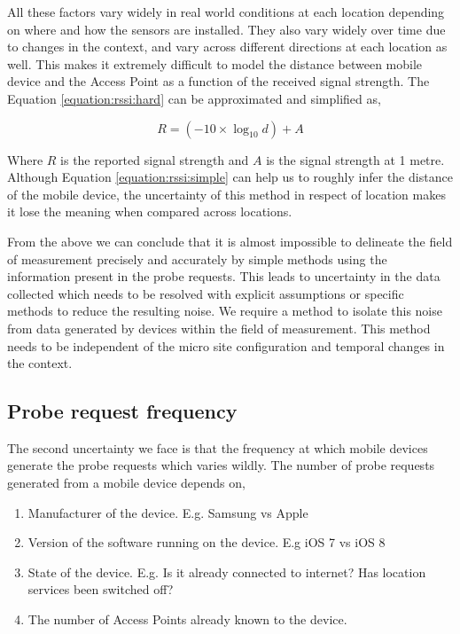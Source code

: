 All these factors vary widely in real world conditions at each location depending on where and how the sensors are installed.
They also vary widely over time due to changes in the context, and vary across different directions at each location as well.
This makes it extremely difficult to model the distance between mobile device and the Access Point as a function of the received signal strength.
The Equation \ref{equation:rssi:hard} can be approximated and simplified as,

\begin{equation}
  R = (-10 \times \log_{10}{d}) + A
  \label{equation:rssi:simple}
\end{equation}

Where \(R\) is the reported signal strength and \(A\) is the signal strength at 1 metre.
Although Equation \ref{equation:rssi:simple} can help us to roughly infer the distance of the mobile device, the uncertainty of this method in respect of location makes it lose the meaning when compared across locations.

From the above we can conclude that it is almost impossible to delineate the field of measurement precisely and accurately by simple methods using the information present in the probe requests.
This leads to uncertainty in the data collected which needs to be resolved with explicit assumptions or specific methods to reduce the resulting noise.
We require a method to isolate this noise from data generated by devices within the field of measurement.
This method needs to be independent of the micro site configuration and temporal changes in the context.

\subsection{Probe request frequency}
The second uncertainty we face is that the frequency at which mobile devices generate the probe requests which varies wildly.
The number of probe requests generated from a mobile device depends on,

\begin{enumerate}
  \setlength{\itemindent}{2em}
  \itemsep-0.5em
  \item Manufacturer of the device. E.g. Samsung vs Apple
  \item Version of the software running on the device. E.g iOS 7 vs iOS 8
  \item State of the device. E.g. Is it already connected to internet? Has location services been switched off?
  \item The number of Access Points already known to the device.
\end{enumerate}

